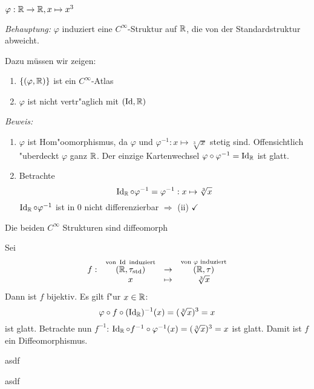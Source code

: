\begin{Loes}
$\varphi: \operatorname{\mathbb{R}} \to \operatorname{\mathbb{R}}, x \mapsto x^3$

\emph{Behauptung:} $\varphi$ induziert eine $C^\infty$-Struktur auf $\operatorname{\mathbb{R}}$, die von der Standardstruktur abweicht.

Dazu müssen wir zeigen:\begin{enumerate}[font=\normalfont,label=(\roman*)]
\item
	$\{(\varphi, \operatorname{\mathbb{R}})\}$ ist ein $C^\infty$-Atlas
\item
	$\varphi$ ist nicht vertr"aglich mit $(\operatorname{Id}, \operatorname{\mathbb{R}})$
\end{enumerate}
\emph{Beweis:}\begin{enumerate}[leftmargin=*,widest=ii,font=\normalfont,label=(\roman*)]
\item
	$\varphi$ ist Hom"oomorphismus, da $\varphi$ und $\varphi^{-1}: x \mapsto \sqrt[3]{x}$ stetig sind. Offensichtlich "uberdeckt $\varphi$ ganz $\operatorname{\mathbb{R}}$. Der einzige Kartenwechsel $\varphi \circ \varphi^{-1} = \operatorname{Id}_{\operatorname{\mathbb{R}}}$ ist glatt.
\item
	Betrachte
		\[ \operatorname{Id}_{\operatorname{\mathbb{R}}} \circ \varphi^{-1} = \varphi^{-1}: x \mapsto \sqrt[3]{x} \]
	$\operatorname{Id}_{\operatorname{\mathbb{R}}} \circ \varphi^{-1}$ ist in $0$ nicht differenzierbar $\Rightarrow$ (ii) $\checkmark$
\end{enumerate}
\begin{description}[font=\normalfont\itshape]
\item[Behauptung:]
	Die beiden $C^\infty$ Strukturen sind diffeomorph
\item[Beweis:]
	Sei
		\[\begin{array}{cccc} f:&  \overset{\text{von } \operatorname{Id} \text{ induziert}}{(\operatorname{\mathbb{R}}, \tau_{\text{std}})} &\to& \overset{\text{von } \varphi \text{ induziert}}{(\operatorname{\mathbb{R}}, \tau)} \\
			& x &\mapsto& \sqrt[3]{x} \end{array}\]
	\marginnote{\textcolor{red}{[BILD]}}
	Dann ist $f$ bijektiv. Es gilt f"ur $x \in \operatorname{\mathbb{R}}$:
		\[ \varphi \circ f \circ (\operatorname{Id}_{\operatorname{\mathbb{R}}})^{-1} (x) = (\sqrt[3]{x})^3 = x \]
	ist glatt. Betrachte nun $f^{-1}$: $\operatorname{Id}_{\operatorname{\mathbb{R}}} \circ f^{-1} \circ \varphi^{-1}(x) = (\sqrt[3]{x})^3 = x$ ist glatt. Damit ist $f$ ein Diffeomorphismus.
\end{description}
\end{Loes}

\begin{Loes}
asdf
\end{Loes}

\begin{Loes}
asdf
\end{Loes}